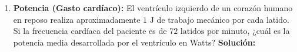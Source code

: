 \documentclass[12pt,letterpaper]{article}
\begin{document}
\begin{enumerate}
    \item \textbf{Potencia (Gasto cardíaco):} El ventrículo izquierdo de un corazón humano en reposo realiza aproximadamente $1 \text{ J}$ de trabajo mecánico por cada latido. Si la frecuencia cardíaca del paciente es de $72 \text{ latidos por minuto}$, ¿cuál es la potencia media desarrollada por el ventrículo en Watts?
    \textbf{Solución:} \\

\end{enumerate}
\end{document}
